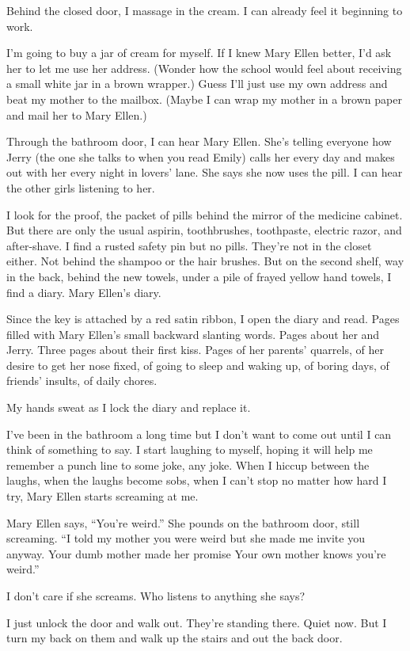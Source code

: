 \documentclass[
]{article}
\begin{document}
Behind the closed door, I massage in the cream. I can already feel it
beginning to work.

I'm going to buy a jar of cream for myself. If I knew Mary Ellen better,
I'd ask her to let me use her address. (Wonder how the school would feel
about receiving a small white jar in a brown wrapper.) Guess I'll just
use my own address and beat my mother to the mailbox. (Maybe I can wrap
my mother in a brown paper and mail her to Mary Ellen.)

Through the bathroom door, I can hear Mary Ellen. She's telling everyone
how Jerry (the one she talks to when you read Emily) calls her every day
and makes out with her every night in lovers' lane. She says she now
uses the pill. I can hear the other girls listening to her.

I look for the proof, the packet of pills behind the mirror of the
medicine cabinet. But there are only the usual aspirin, toothbrushes,
toothpaste, electric razor, and after-shave. I find a rusted safety pin
but no pills. They're not in the closet either. Not behind the shampoo
or the hair brushes. But on the second shelf, way in the back, behind
the new towels, under a pile of frayed yellow hand towels, I find a
diary. Mary Ellen's diary.

Since the key is attached by a red satin ribbon, I open the diary and
read. Pages filled with Mary Ellen's small backward slanting words.
Pages about her and Jerry. Three pages about their first kiss. Pages of
her parents' quarrels, of her desire to get her nose fixed, of going to
sleep and waking up, of boring days, of friends' insults, of daily
chores.

My hands sweat as I lock the diary and replace it.

I've been in the bathroom a long time but I don't want to come out until
I can think of some­thing to say. I start laughing to myself, hoping it
will help me remember a punch line to some joke, any joke. When I hiccup
between the laughs, when the laughs become sobs, when I can't stop no
matter how hard I try, Mary Ellen starts screaming at me.

Mary Ellen says, ``You're weird.'' She pounds on the bathroom door,
still screaming. ``I told my mother you were weird but she made me
invite you anyway. Your dumb mother made her pro­mise Your own mother
knows you're weird.''

I don't care if she screams. Who listens to anything she says?

I just unlock the door and walk out. They're standing there. Quiet now.
But I turn my back on them and walk up the stairs and out the back door.
\end{document}
